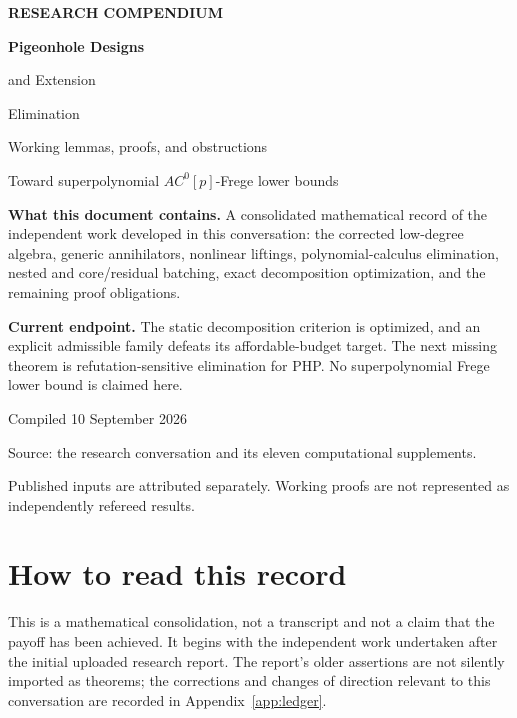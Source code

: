 \documentclass[11pt,oneside]{report}
\theoremstyle{research}
\theoremstyle{definition}
\theoremstyle{remark}
\newcommand{\AC}{AC^{0}[p]}
\begin{document}
\begin{titlepage}
\color{ink}
\vspace*{14mm}
{\small\sffamily\bfseries RESEARCH COMPENDIUM\par}
\vspace{11mm}
{\fontsize{31}{36}\selectfont\bfseries Pigeonhole Designs\par and Extension\par Elimination\par}
\vspace{8mm}
{\Large Working lemmas, proofs, and obstructions\par}
\vspace{5mm}
{\large Toward superpolynomial $\AC$-Frege lower bounds\par}
\vspace{15mm}
\begin{statusbox}
\textbf{What this document contains.} A consolidated mathematical record of the independent work developed in this conversation: the corrected low-degree algebra, generic annihilators, nonlinear liftings, polynomial-calculus elimination, nested and core/residual batching, exact decomposition optimization, and the remaining proof obligations.\par
\textbf{Current endpoint.} The static decomposition criterion is optimized, and an explicit admissible family defeats its affordable-budget target. The next missing theorem is refutation-sensitive elimination for PHP. No superpolynomial Frege lower bound is claimed here.
\end{statusbox}
\vfill
{\large Compiled 10 September 2026\par}
\vspace{4mm}
{\small\color{graytext}Source: the research conversation and its eleven computational supplements.\par Published inputs are attributed separately. Working proofs are not represented as independently refereed results.}
\end{titlepage}
\chapter*{How to read this record}
This is a mathematical consolidation, not a transcript and not a claim that the payoff has been achieved. It begins with the independent work undertaken after the initial uploaded research report. The report's older assertions are not silently imported as theorems; the corrections and changes of direction relevant to this conversation are recorded in Appendix~\ref{app:ledger}.
\end{document}
